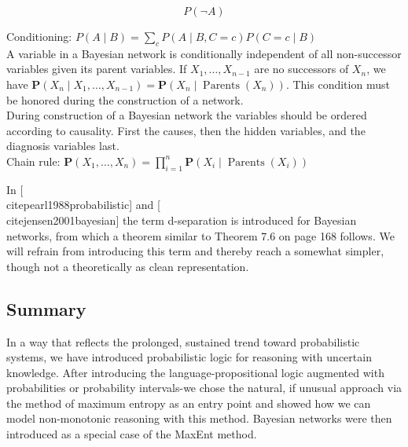 \documentclass[10pt]{book}
\begin{document}
$$
P(\neg A)
$$

Conditioning: $P(A \mid B)=\sum_{c} P(A \mid B, C=c) P(C=c \mid B)$\\
A variable in a Bayesian network is conditionally independent of all non-successor variables given its parent variables. If $X_{1}, \ldots, X_{n-1}$ are no successors of $X_{n}$, we have $\boldsymbol{P}\left(X_{n} \mid X_{1}, \ldots, X_{n-1}\right)=\boldsymbol{P}\left(X_{n} \mid \operatorname{Parents}\left(X_{n}\right)\right)$. This condition must be honored during the construction of a network.\\
During construction of a Bayesian network the variables should be ordered according to causality. First the causes, then the hidden variables, and the diagnosis variables last.\\
Chain rule: $\boldsymbol{P}\left(X_{1}, \ldots, X_{n}\right)=\prod_{i=1}^{n} \boldsymbol{P}\left(X_{i} \mid \operatorname{Parents}\left(X_{i}\right)\right)$

In [\\cite{pearl1988probabilistic}] and [\\cite{jensen2001bayesian}] the term d-separation is introduced for Bayesian networks, from which a theorem similar to Theorem 7.6 on page 168 follows. We will refrain from introducing this term and thereby reach a somewhat simpler, though not a theoretically as clean representation.

\subsection*{Summary}
In a way that reflects the prolonged, sustained trend toward probabilistic systems, we have introduced probabilistic logic for reasoning with uncertain knowledge. After introducing the language-propositional logic augmented with probabilities or probability intervals-we chose the natural, if unusual approach via the method of maximum entropy as an entry point and showed how we can model non-monotonic reasoning with this method. Bayesian networks were then introduced as a special case of the MaxEnt method.
\end{document}
